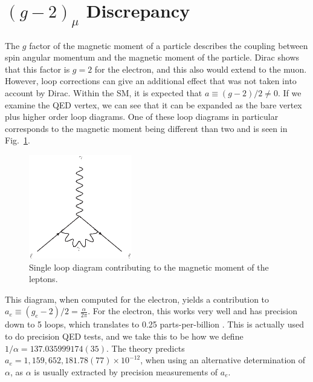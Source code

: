 \section{$(g-2)_\mu$ Discrepancy}
The $g$ factor of the magnetic moment of a particle describes the coupling between spin angular momentum and the magnetic moment of the particle.
Dirac shows that this factor is $g=2$ for the electron, and this also would extend to the muon.
However, loop corrections can give an additional effect that was not taken into account by Dirac.
Within the SM, it is expected that $a \equiv (g-2)/2 \neq 0$.
If we examine the QED vertex, we can see that it can be expanded as the bare vertex plus higher order loop diagrams.
One of these loop diagrams in particular corresponds to the magnetic moment being different than two and is seen in Fig.~\ref{fig:magnetic_moment}.

\begin{figure}[h]
    \centering
    \includegraphics[width=0.4\textwidth]{Figures/feynman_diagrams/muon_magnetic_moment}
    \caption{Single loop diagram contributing to the magnetic moment of the leptons.}
    \label{fig:magnetic_moment}
\end{figure}

This diagram, when computed for the electron, yields a contribution to $a_e \equiv (g_e - 2)/2 = \frac{\alpha}{2\pi}$.
For the electron, this works very well and has precision down to 5 loops, which translates to 0.25 parts-per-billion \cite{Aoyama:2012wj}.
This is actually used to do precision QED tests, and we take this to be how we define $1/\alpha = 137.035999174(35)$.
The theory predicts $a_e = 1,159,652,181.78(77)\times 10^{-12}$, when using an alternative determination of $\alpha$, as $\alpha$ is usually extracted by precision measurements of $a_e$.

